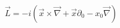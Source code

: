\begin{equation}
\vec{L}=-i(\vec{x} \times \vec{\nabla} + \vec{x} \partial_{0} -x_{0} \vec{\nabla})
\end{equation}

